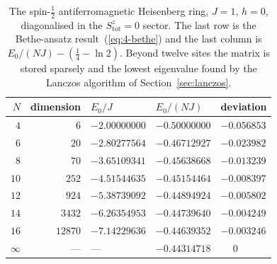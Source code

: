\begin{table}[h]
\centering
\renewcommand{\arraystretch}{1.25}
\setlength{\tabcolsep}{11pt}
\begin{tabular}{rrlll}
\toprule
$N$ & dimension & $E_0/J$ & $E_0/(NJ)$ & deviation\\
\midrule
$4$  & $6$     & $-2.00000000$ & $-0.50000000$ & $-0.056853$\\
$6$  & $20$    & $-2.80277564$ & $-0.46712927$ & $-0.023982$\\
$8$  & $70$    & $-3.65109341$ & $-0.45638668$ & $-0.013239$\\
$10$ & $252$   & $-4.51544635$ & $-0.45154464$ & $-0.008397$\\
$12$ & $924$   & $-5.38739092$ & $-0.44894924$ & $-0.005802$\\
$14$ & $3432$  & $-6.26354953$ & $-0.44739640$ & $-0.004249$\\
$16$ & $12870$ & $-7.14229636$ & $-0.44639352$ & $-0.003246$\\
\midrule
$\infty$ & --- & --- & $-0.44314718$ & $\phantom{-}0$\\
\bottomrule
\end{tabular}
\caption{The spin-$\tfrac12$ antiferromagnetic Heisenberg ring, $J=1$, $h=0$,
diagonalised in the $S^z_{\mathrm{tot}}=0$ sector.  The last row is the
Bethe-ansatz result~(\ref{eq:4-bethe}) and the last column is
$E_0/(NJ)-(\tfrac14-\ln2)$.  Beyond twelve sites the matrix is stored sparsely
and the lowest eigenvalue found by the Lanczos algorithm of
Section~\ref{sec:lanczos}.}
\label{tab:heisenberg}
\end{table}


